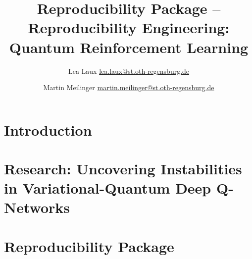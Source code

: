 \documentclass[conference]{IEEEtran}
\title{Reproducibility Package -- Reproducibility Engineering: Quantum Reinforcement Learning}
\author{Lea Laux \href{mailto:lea.laux@st.oth-regensburg.de}{lea.laux@st.oth-regensburg.de}  \and 
 Martin Meilinger \href{mailto:martin.meilinger@st.oth-regensburg.de}{martin.meilinger@st.oth-regensburg.de}}
\begin{document}
\begin{acronym}
\end{acronym}

\maketitle

\section{Introduction}


\section{Research: Uncovering Instabilities in Variational-Quantum Deep Q-Networks}



\section{Reproducibility Package}


\printbibliography
\end{document}

